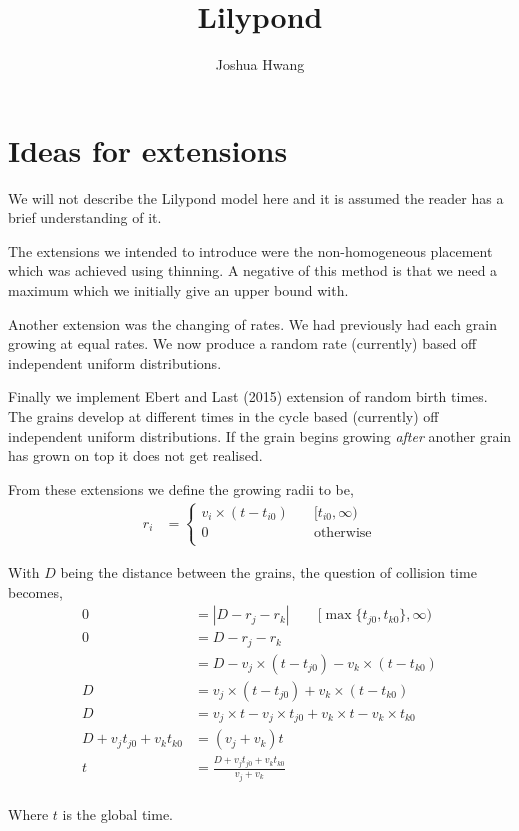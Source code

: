 \documentclass{article}
\title{Lilypond}
\author{Joshua Hwang}
\begin{document}
\section{Ideas for extensions}
We will not describe the Lilypond model here and it is assumed the
reader has a brief understanding of it.

The extensions we intended to introduce were the non-homogeneous
placement which was achieved using thinning.
A negative of this method is that we need a maximum which we initially
give an upper bound with.

Another extension was the changing of rates. We had previously had
each grain growing at equal rates. We now produce a random rate
(currently) based off independent uniform distributions.

Finally we implement Ebert and Last (2015) extension of random birth
times. The grains develop at different times in the cycle based
(currently) off independent uniform distributions. If the grain
begins growing \emph{after} another grain has grown on top it does not
get realised.

From these extensions we define the growing radii to be,
\begin{align*}
    r_i
    &=
    \begin{cases}
        v_i \times (t - t_{i0}) \quad &[t_{i0}, \infty) \\
        0 &\text{otherwise} \\
    \end{cases}
\end{align*}

With $D$ being the distance between the grains,
the question of collision time becomes,
\begin{align*}
    0 &= |D - r_j - r_k| \qquad [\max\{t_{j0}, t_{k0}\}, \infty) \\
    0 &= D - r_j - r_k \\
    &= D - v_j \times (t - t_{j0}) - v_k \times (t - t_{k0}) \\
    D &= v_j \times (t - t_{j0}) + v_k \times (t - t_{k0}) \\
    D &= v_j \times t - v_j \times t_{j0} + v_k \times t - v_k \times t_{k0} \\
    D + v_j t_{j0} + v_k t_{k0} &= (v_j + v_k)t \\
    t &= \frac{D + v_j t_{j0} + v_k t_{k0}}{v_j + v_k} \\
\end{align*}

Where $t$ is the global time.
\end{document}
